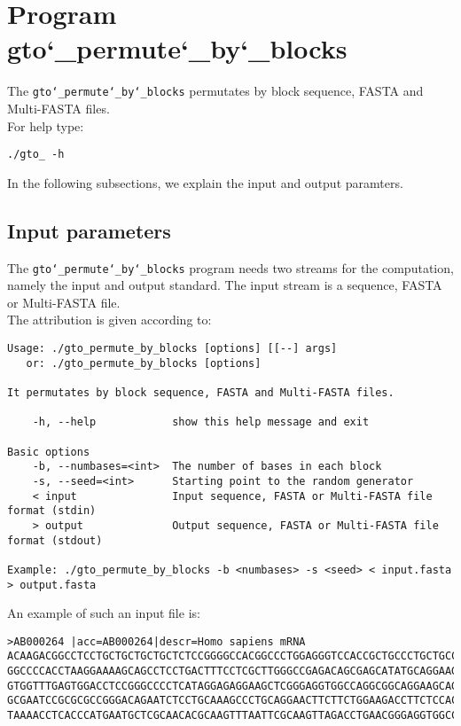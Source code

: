 \section{Program gto\char`_permute\char`_by\char`_blocks}
The \texttt{gto\char`_permute\char`_by\char`_blocks} permutates by block sequence, FASTA and Multi-FASTA files.\\
For help type:
\begin{lstlisting}
./gto_ -h
\end{lstlisting}
In the following subsections, we explain the input and output paramters.

\subsection*{Input parameters}

The \texttt{gto\char`_permute\char`_by\char`_blocks} program needs two streams for the computation, namely the input and output standard. The input stream is a sequence, FASTA or Multi-FASTA file.\\
The attribution is given according to:
\begin{lstlisting}
Usage: ./gto_permute_by_blocks [options] [[--] args]
   or: ./gto_permute_by_blocks [options]

It permutates by block sequence, FASTA and Multi-FASTA files.

    -h, --help            show this help message and exit

Basic options
    -b, --numbases=<int>  The number of bases in each block
    -s, --seed=<int>      Starting point to the random generator
    < input               Input sequence, FASTA or Multi-FASTA file format (stdin)
    > output              Output sequence, FASTA or Multi-FASTA file format (stdout)

Example: ./gto_permute_by_blocks -b <numbases> -s <seed> < input.fasta > output.fasta
\end{lstlisting}
An example of such an input file is:
\begin{lstlisting}
>AB000264 |acc=AB000264|descr=Homo sapiens mRNA 
ACAAGACGGCCTCCTGCTGCTGCTGCTCTCCGGGGCCACGGCCCTGGAGGGTCCACCGCTGCCCTGCTGCCATTGTCCCC
GGCCCCACCTAAGGAAAAGCAGCCTCCTGACTTTCCTCGCTTGGGCCGAGACAGCGAGCATATGCAGGAAGCGGCAGGAA
GTGGTTTGAGTGGACCTCCGGGCCCCTCATAGGAGAGGAAGCTCGGGAGGTGGCCAGGCGGCAGGAAGCAGGCCAGTGCC
GCGAATCCGCGCGCCGGGACAGAATCTCCTGCAAAGCCCTGCAGGAACTTCTTCTGGAAGACCTTCTCCACCCCCCCAGC
TAAAACCTCACCCATGAATGCTCGCAACACGCAAGTTTAATTCGCAAGTTAGACCTGAACGGGAGGTGGCCACGCAAGTT
\end{lstlisting}

